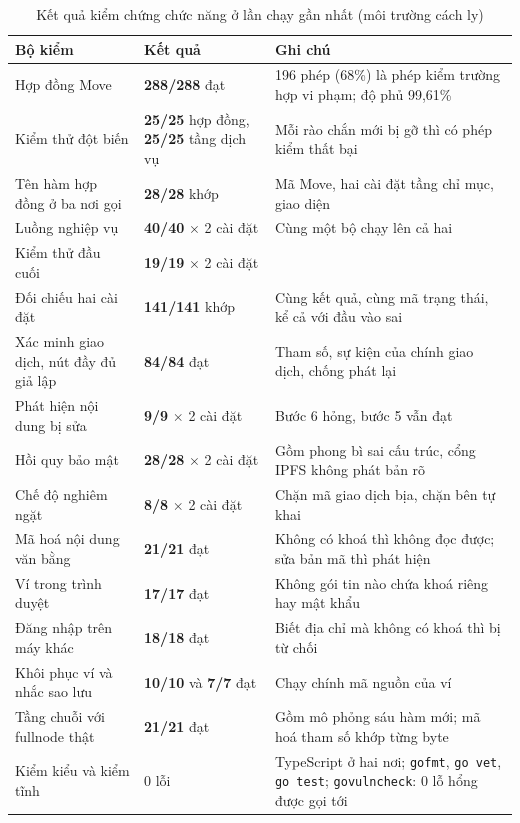 \begin{table}[H]
\centering
\caption{Kết quả kiểm chứng chức năng ở lần chạy gần nhất (môi trường cách ly)}
\label{tab:v2-test-results}
\renewcommand{\arraystretch}{1.2}
\small
\begin{tabular}{|p{4.6cm}|p{3.6cm}|p{5.0cm}|}
\hline
\textbf{Bộ kiểm} & \textbf{Kết quả} & \textbf{Ghi chú} \\ \hline
Hợp đồng Move & \textbf{288/288} đạt & 196 phép (68\%) là phép kiểm trường hợp vi phạm; độ phủ 99,61\% \\ \hline
Kiểm thử đột biến & \textbf{25/25} hợp đồng, \textbf{25/25} tầng dịch vụ & Mỗi rào chắn mới bị gỡ thì có phép kiểm thất bại \\ \hline
Tên hàm hợp đồng ở ba nơi gọi & \textbf{28/28} khớp & Mã Move, hai cài đặt tầng chỉ mục, giao diện \\ \hline
Luồng nghiệp vụ & \textbf{40/40} $\times$ 2 cài đặt & Cùng một bộ chạy lên cả hai \\ \hline
Kiểm thử đầu cuối & \textbf{19/19} $\times$ 2 cài đặt & \\ \hline
Đối chiếu hai cài đặt & \textbf{141/141} khớp & Cùng kết quả, cùng mã trạng thái, kể cả với đầu vào sai \\ \hline
Xác minh giao dịch, nút đầy đủ giả lập & \textbf{84/84} đạt & Tham số, sự kiện của chính giao dịch, chống phát lại \\ \hline
Phát hiện nội dung bị sửa & \textbf{9/9} $\times$ 2 cài đặt & Bước 6 hỏng, bước 5 vẫn đạt \\ \hline
Hồi quy bảo mật & \textbf{28/28} $\times$ 2 cài đặt & Gồm phong bì sai cấu trúc, cổng IPFS không phát bản rõ \\ \hline
Chế độ nghiêm ngặt & \textbf{8/8} $\times$ 2 cài đặt & Chặn mã giao dịch bịa, chặn bên tự khai \\ \hline
Mã hoá nội dung văn bằng & \textbf{21/21} đạt & Không có khoá thì không đọc được; sửa bản mã thì phát hiện \\ \hline
Ví trong trình duyệt & \textbf{17/17} đạt & Không gói tin nào chứa khoá riêng hay mật khẩu \\ \hline
Đăng nhập trên máy khác & \textbf{18/18} đạt & Biết địa chỉ mà không có khoá thì bị từ chối \\ \hline
Khôi phục ví và nhắc sao lưu & \textbf{10/10} và \textbf{7/7} đạt & Chạy chính mã nguồn của ví \\ \hline
Tầng chuỗi với fullnode thật & \textbf{21/21} đạt & Gồm mô phỏng sáu hàm mới; mã hoá tham số khớp từng byte \\ \hline
Kiểm kiểu và kiểm tĩnh & 0 lỗi & TypeScript ở hai nơi; \texttt{gofmt}, \texttt{go vet}, \texttt{go test}; \texttt{govulncheck}: 0 lỗ hổng được gọi tới \\ \hline
\end{tabular}
\end{table}
